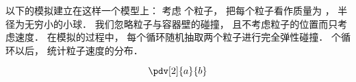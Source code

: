 
以下的模拟建立在这样一个模型上： 考虑  个粒子， 把每个粒子看作质量为 ， 半径为无穷小的小球． 我们忽略粒子与容器壁的碰撞， 且不考虑粒子的位置而只考虑速度． 在模拟的过程中， 每个循环随机抽取两个粒子进行完全弹性碰撞．  个循环以后， 统计粒子速度的分布．

\begin{equation}
\pdv[2]{a}{b}
\end{equation}

